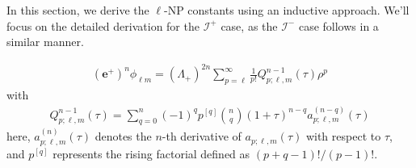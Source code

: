 \noindent
In this section, we derive the $\ell$-NP constants using an inductive approach. We'll focus on the detailed derivation for the $\mathscr{I}^{+}$ case, as the $\mathscr{I}^{-}$ case follows in a similar manner.
\begin{proposition}\label{lemmaMainNPplus}
  \begin{align}\label{eq:bmelplusonephilm}
    (\boldsymbol{e}^{+})^{n}\phi_{\ell m} = (\Lambda_{+})^{2n}\sum_{p=\ell}^{\infty}\frac{1}{p!}Q^{n-1}_{p;\ell,m}(\tau)\rho^{p}
  \end{align}
  with
  \begin{align}\label{eq:Qn}
    Q^{n-1}_{p;\ell,m}(\tau)= \sum_{q=0}^{n}(-1)^q p^{[q]} {n \choose q}(1+\tau)^{n-q}a_{p;\ell,m}^{(n-q)}(\tau)
  \end{align}
  here, $a_{p;\ell,m}^{(n)}(\tau)$ denotes the $n$-th derivative of $a_{p;\ell,m}(\tau)$ with respect to $\tau$, and $p^{[q]}$ represents the rising factorial defined as $(p+q-1)!/(p-1)!$.
\end{proposition}
